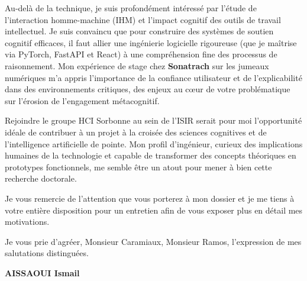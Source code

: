 \documentclass[a4paper,11pt]{article}
\begin{document}
Au-delà de la technique, je suis profondément intéressé par l'étude de l'interaction homme-machine (IHM) et l'impact cognitif des outils de travail intellectuel. Je suis convaincu que pour construire des systèmes de soutien cognitif efficaces, il faut allier une ingénierie logicielle rigoureuse (que je maîtrise via PyTorch, FastAPI et React) à une compréhension fine des processus de raisonnement. Mon expérience de stage chez \textbf{Sonatrach} sur les jumeaux numériques m'a appris l'importance de la confiance utilisateur et de l'explicabilité dans des environnements critiques, des enjeux au cœur de votre problématique sur l'érosion de l'engagement métacognitif.

Rejoindre le groupe HCI Sorbonne au sein de l'ISIR serait pour moi l'opportunité idéale de contribuer à un projet à la croisée des sciences cognitives et de l'intelligence artificielle de pointe. Mon profil d'ingénieur, curieux des implications humaines de la technologie et capable de transformer des concepts théoriques en prototypes fonctionnels, me semble être un atout pour mener à bien cette recherche doctorale.

Je vous remercie de l'attention que vous porterez à mon dossier et je me tiens à votre entière disposition pour un entretien afin de vous exposer plus en détail mes motivations.

Je vous prie d'agréer, Monsieur Caramiaux, Monsieur Ramos, l'expression de mes salutations distinguées.

\vspace{0.4cm}

\begin{flushleft}
    \textbf{AISSAOUI Ismail}
\end{flushleft}
\end{document}
